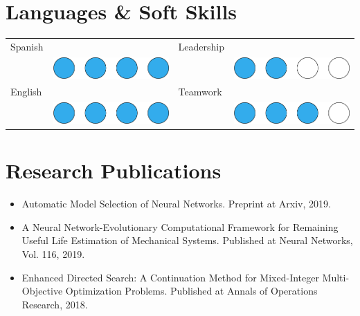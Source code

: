 \documentclass[a4paper,10pt]{article}
\begin{document}
\begin{minipage}[H]{0.38\textwidth}%

\section{Languages \& Soft Skills}

\begin{tabular}{ l l l l }
Spanish & &  Leadership \\
& \includegraphics[scale=0.1]{icons/balls_proficient.pdf} & & \includegraphics[scale=0.1]{icons/balls_mid.pdf} \\
English & & Teamwork \\
& \includegraphics[scale=0.1]{icons/balls_proficient.pdf} & & \includegraphics[scale=0.1]{icons/balls_advanced.pdf}
\end{tabular}

\end{minipage}%

\section{Research Publications}
\begin{itemize}
\item Automatic Model Selection of Neural Networks. Preprint at Arxiv, 2019.
\item A Neural Network-Evolutionary Computational Framework for Remaining Useful Life Estimation of Mechanical Systems. Published at Neural Networks, Vol. 116, 2019.
\item Enhanced Directed Search: A Continuation Method for Mixed-Integer Multi-Objective Optimization Problems. Published at Annals of Operations Research, 2018.
\end{itemize}
\end{document}
